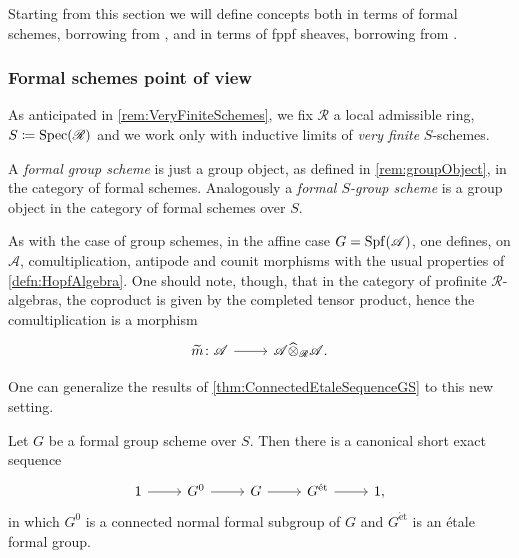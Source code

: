 Starting from this section we will define
concepts both in terms of formal schemes, borrowing from \cite{Shatz},
and in terms of fppf sheaves, borrowing from \cite{Messing}.



\subsubsection{Formal schemes point of view}
As anticipated in \cref{rem:VeryFiniteSchemes},
we fix $\mathscr{R}$ a local admissible ring, $S \coloneqq \operatorname{Spec}(\mathscr{R})$
and we work only with inductive limits of \emph{very finite} $S$-schemes.


\begin{defn}
	A \emph{formal group scheme}
	is just a group object,
	as defined in \cref{rem:groupObject},
	in the category of formal schemes.
	Analogously a \emph{formal $S$-group scheme}
	is a group object in the category of formal schemes over $S$.
\end{defn}


\begin{rem}[]\label{FormalHopf}
	As with the case of group schemes, in the affine case
	$G = \operatorname{Spf}(\mathscr{A})$,
	one defines, on $\mathscr{A}$, comultiplication, antipode and counit morphisms
	with the usual properties of \cref{defn:HopfAlgebra}.
	One should note, though, that in the category of 
	profinite $\mathscr{R}$-algebras, the coproduct is given by
	the completed tensor product, hence the comultiplication
	is a morphism
	\begin{equation*}
	\begin{tikzcd}[row sep = 0ex
		,/tikz/column 1/.append style={anchor=base east}
		,/tikz/column 2/.append style={anchor=base west}]
		\widetilde{m}\colon \mathscr{A} \arrow[r, "", rightarrow] &
		\mathscr{A} \widehat{\otimes}_{ \mathscr{R} } \mathscr{A}
	.\end{tikzcd}
	\end{equation*} 
\end{rem}


\noindent
One can generalize the results of \cref{thm:ConnectedEtaleSequenceGS} to this new setting.
\begin{thm}\label{thm:ConnectedEtaleSeqFormalGr}
	Let $G$ be a formal group scheme over $S$.
	Then there is a canonical short exact sequence
	\begin{equation*}
	\begin{tikzcd}
		1 \arrow[r, "", rightarrow] &
		G^0 \arrow[r, "", rightarrow] &
		G \arrow[r, "", rightarrow] &
		G^{\mathrm{\acute et}} \arrow[r, "", rightarrow] &
		1
	,\end{tikzcd}
	\end{equation*}
	in which $G^0$ is a connected normal formal subgroup of $G$
	and $G^{\mathrm{\acute et}}$ is an étale formal group.
\end{thm}


